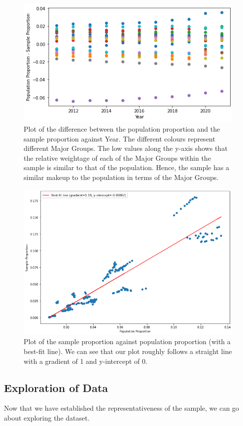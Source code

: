 \documentclass[11pt]{article}
\begin{document}
\begin{figure}[!htb]
	\centering
	\includegraphics[width=12cm]{Figures/sample test.png}
	\caption{Plot of the difference between the population proportion and the sample proportion against Year. The different colours represent different Major Groups. The low values along the y-axis shows that the relative weightage of each of the Major Groups within the sample is similar to that of the population. Hence, the sample has a similar makeup to the population in terms of the Major Groups.}
	\label{fig:relativeweightage}
\end{figure}

\begin{figure}[!htb]
	\centering
	\includegraphics[width=12cm]{Figures/Sample Proportion against Population Proportion.png}
	\caption{Plot of the sample proportion against population proportion (with a best-fit line). We can see that our plot roughly follows a straight line with a gradient of 1 and y-intercept of 0.}
	\label{fig:sampleprop vs popprop}
\end{figure}

\subsection{Exploration of Data}
Now that we have established the representativeness of the sample, we can go about exploring the dataset. 
\end{document}
